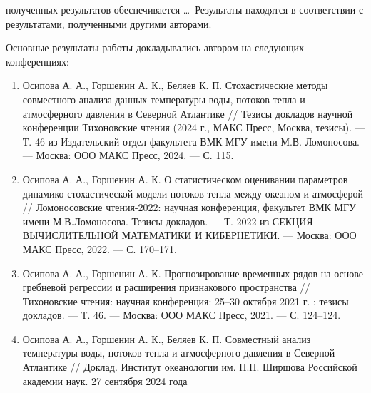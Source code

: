 {\reliability} полученных результатов обеспечивается \ldots \ Результаты находятся в соответствии с результатами, полученными другими авторами.


{\probation}
Основные результаты работы докладывались автором
на следующих конференциях:
\begin{enumerate}[beginpenalty=10000]
	\item Осипова А. А., Горшенин А. К., Беляев К. П. Стохастические методы совместного анализа данных температуры воды, потоков тепла и атмосферного давления в Северной Атлантике // Тезисы докладов научной конференции Тихоновские чтения (2024 г., МАКС Пресс, Москва, тезисы). — Т. 46 из Издательский отдел факультета ВМК МГУ имени М.В. Ломоносова. — Москва: ООО МАКС Пресс, 2024. — С. 115.
	\item Осипова А. А., Горшенин А. К. О статистическом оценивании параметров динамико-стохастической модели потоков тепла между океаном и атмосферой // Ломоносовские чтения-2022: научная конференция, факультет ВМК МГУ имени М.В.Ломоносова. Тезисы докладов. — Т. 2022 из СЕКЦИЯ ВЫЧИСЛИТЕЛЬНОЙ МАТЕМАТИКИ И КИБЕРНЕТИКИ. — Москва: ООО МАКС Пресс, 2022. — С. 170–171.
	\item Осипова А. А., Горшенин А. К. Прогнозирование временных рядов на основе гребневой регрессии и расширения признакового пространства // Тихоновские чтения: научная конференция: 25–30 октября 2021 г. : тезисы докладов. — Т. 46. — Москва: ООО МАКС Пресс, 2021. — С. 124–124.
	\item Осипова А. А., Горшенин А. К., Беляев К. П. Совместный анализ температуры воды,
	потоков тепла и атмосферного давления в
	Северной Атлантике // Доклад. Институт океанологии им. П.П. Ширшова Российской академии наук. 27 сентября 2024 года
\end{enumerate}


